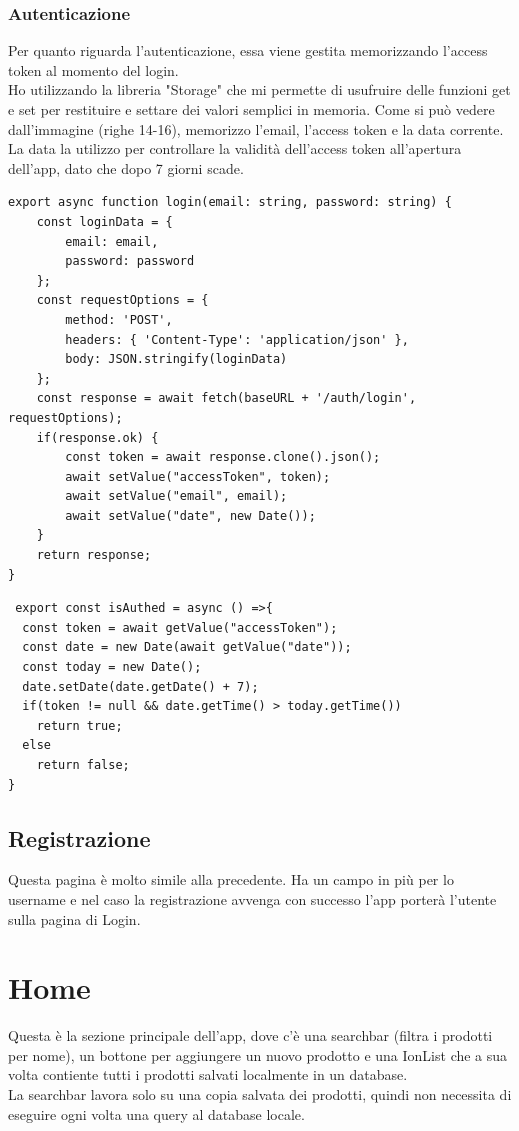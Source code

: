 \documentclass[11pt]{article}
\begin{document}
\subsubsection{Autenticazione}
Per quanto riguarda l'autenticazione, essa viene gestita memorizzando l'access token al momento del login.\\
Ho utilizzando la libreria "Storage" che mi permette di usufruire delle funzioni get e set per restituire e settare dei valori semplici in memoria. Come si può vedere dall'immagine (righe 14-16), memorizzo l'email, l'access token e la data corrente. La data la utilizzo per controllare la validità dell'access token all'apertura dell'app, dato che dopo 7 giorni scade.

\begin{lstlisting}
export async function login(email: string, password: string) {
    const loginData = {
        email: email,
        password: password
    };
    const requestOptions = {
        method: 'POST',
        headers: { 'Content-Type': 'application/json' },
        body: JSON.stringify(loginData)
    };
    const response = await fetch(baseURL + '/auth/login', requestOptions);
    if(response.ok) {
        const token = await response.clone().json();
        await setValue("accessToken", token);
        await setValue("email", email);
        await setValue("date", new Date());
    }
    return response;
}
\end{lstlisting}

\newpage

\begin{lstlisting}
 export const isAuthed = async () =>{
  const token = await getValue("accessToken");
  const date = new Date(await getValue("date"));
  const today = new Date();
  date.setDate(date.getDate() + 7);
  if(token != null && date.getTime() > today.getTime())
    return true;
  else
    return false;
}
\end{lstlisting}


\subsection{Registrazione}
Questa pagina è molto simile alla precedente. Ha un campo in più per lo username e nel caso la registrazione avvenga con successo l'app porterà l'utente sulla pagina di Login.


\section{Home}
Questa è la sezione principale dell'app, dove c'è una searchbar (filtra i prodotti per nome), un bottone per aggiungere un nuovo prodotto e una IonList che a sua volta contiente tutti i prodotti salvati localmente in un database.\\
La searchbar lavora solo su una copia salvata dei prodotti, quindi non necessita di eseguire ogni volta una query al database locale.
\end{document}
